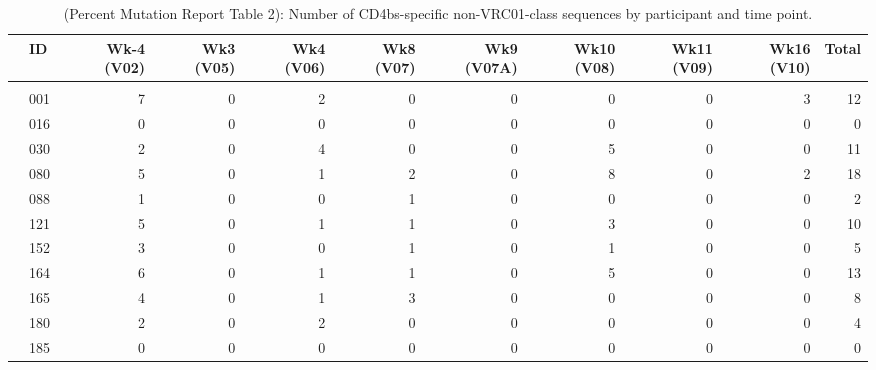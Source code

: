 \documentclass[
]{article}
\author{}
\date{\vspace{-2.5em}}
\begin{document}
\begin{table}[!h]

\caption[(Percent Mutation Report Table 2): Number of non-VRC01-class Sequences by participant and time point]{\label{tab:percent-mut-tab-02}(Percent Mutation Report Table 2): Number of CD4bs-specific non-VRC01-class sequences by participant and time point.}
\centering
\fontsize{6}{8}\selectfont
\begin{tabular}[t]{l>{}l|rrrrrrr>{}r|r}
\toprule
 & ID & Wk-4 (V02) & Wk3 (V05) & Wk4 (V06) & Wk8 (V07) & Wk9 (V07A) & Wk10 (V08) & Wk11 (V09) & Wk16 (V10) & Total\\
\midrule
\addlinespace[0.3em]
\multicolumn{11}{l}{\textbf{DPBS sucrose}}\\
\hspace{1em} & 001 & 7 & 0 & 2 & 0 & 0 & 0 & 0 & 3 & 12\\

\hspace{1em} & 016 & 0 & 0 & 0 & 0 & 0 & 0 & 0 & 0 & 0\\

\hspace{1em} & 030 & 2 & 0 & 4 & 0 & 0 & 5 & 0 & 0 & 11\\

\hspace{1em} & 080 & 5 & 0 & 1 & 2 & 0 & 8 & 0 & 2 & 18\\

\hspace{1em} & 088 & 1 & 0 & 0 & 1 & 0 & 0 & 0 & 0 & 2\\

\hspace{1em} & 121 & 5 & 0 & 1 & 1 & 0 & 3 & 0 & 0 & 10\\

\hspace{1em} & 152 & 3 & 0 & 0 & 1 & 0 & 1 & 0 & 0 & 5\\

\hspace{1em} & 164 & 6 & 0 & 1 & 1 & 0 & 5 & 0 & 0 & 13\\

\hspace{1em} & 165 & 4 & 0 & 1 & 3 & 0 & 0 & 0 & 0 & 8\\

\hspace{1em} & 180 & 2 & 0 & 2 & 0 & 0 & 0 & 0 & 0 & 4\\

\hspace{1em} & 185 & 0 & 0 & 0 & 0 & 0 & 0 & 0 & 0 & 0\\


\end{tabular}
\end{table}
\end{document}
